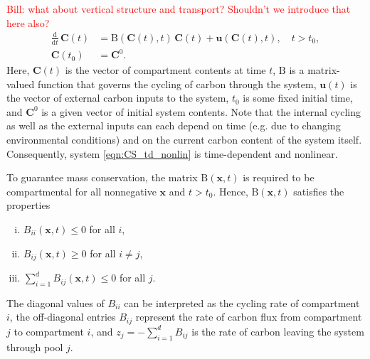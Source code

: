 \documentclass[11pt,a4paper]{article}
\newcommand{\red}[1]{\textcolor{red}{#1}}
\renewcommand{\vec}[1]{\mathbf{#1}}
\newcommand{\tens}[1]{\mathrm{#1}}
\newcommand{\deriv}[1]{\frac{\mathrm{d}}{\mathrm{d}#1}}
\newcommand{\suml}{\sum\limits}
\begin{document}
    \red{Bill: what about vertical structure and transport? Shouldn't we introduce that here also?}
    \begin{equation}\label{eqn:CS_td_nonlin}
        \begin{aligned}
            \deriv{t}\,\vec{C}(t) &= \tens{B}(\vec{C}(t),t)\,\vec{C}(t) + \vec{u}(\vec{C}(t),t),\quad t>t_0,\\
            \vec{C}(t_0) &= \vec{C}^0.
        \end{aligned}
    \end{equation}
Here, $\vec{C}(t)$ is the vector of compartment contents at time $t$, $\tens{B}$ is a matrix-valued function that governs the cycling of carbon through the system, $\vec{u}(t)$ is the vector of external carbon inputs to the system, $t_0$ is some fixed initial time, and $\vec{C}^0$ is a given vector  of initial system contents. Note that the internal cycling as well as the external inputs can each depend on time (e.g. due to changing environmental conditions) and on the current carbon content of the system itself. Consequently, system \eqref{eqn:CS_td_nonlin} is time-dependent and nonlinear.
    
    To guarantee mass conservation, the matrix $\tens{B}(\vec{x},t)$ is required to be compartmental 
    for all nonnegative $\vec{x}$ and $t>t_0$.
    Hence, $\tens{B}(\vec{x},t)$ satisfies the properties
    \begin{enumerate}[(i)]
        \item $B_{ii}(\vec{x},t)\leq0$ for all $i$,
        \item $B_{ij}(\vec{x},t)\geq0$ for all $i\neq j$,
        \item $\suml_{i=1}^d B_{ij}(\vec{x},t)\leq0$ for all $j$.
    \end{enumerate}
    The diagonal values of $B_{ii}$ can be interpreted as the cycling rate of compartment $i$, the off-diagonal entries $B_{ij}$ represent the rate of carbon flux from compartment $j$ to compartment $i$, and $z_j=-\sum_{i=1}^d B_{ij}$ is the rate of carbon leaving the system through pool $j$.
    
\end{document}
